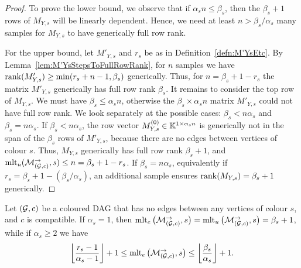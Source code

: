 \begin{proof}
	To prove the lower bound, we observe that if $\alpha_s n \leq \beta_s$, then the $\beta_s + 1$ rows of $M_{Y,s}$ will be linearly dependent. Hence, we need at least $n > \beta_s / \alpha_s$ many samples for $M_{Y,s}$ to have generically full row rank.
	
	For the upper bound, let $M'_{Y,s}$ and $r_s$ be as in Definition~\ref{defn:M'YsEtc}. By Lemma~\ref{lem:M'YsStepsToFullRowRank}, for $n$ samples we have $\operatorname{rank}(M_{Y,s}') \geq \min(r_s + n - 1, \beta_s)$ generically.
	Thus, for $n = \beta_s + 1 - r_s$ the matrix $M'_{Y,s}$ generically has full row rank $\beta_s$.
	It remains to consider the top row of $M_{Y,s}$. We must have $\beta_s \leq \alpha_s n$, otherwise the $\beta_s \times \alpha_s n$ matrix $M'_{Y,s}$ could not have full row rank. We look separately at the possible cases: $\beta_s < n \alpha_s$ and $\beta_s = n \alpha_s$.
	If $\beta_s < n \alpha_s$, the row vector $M_{Y,s}^{(0)} \in \mathbb K^{1 \times \alpha_s n}$ is generically not in the span of the $\beta_s$ rows of $M'_{Y,s}$, because there are no edges between vertices of colour $s$. Thus, $M_{Y,s}$ generically has full row rank $\beta_s + 1$, and $\operatorname{mlt}_u(\mathcal{M}_{(\mathcal{G}, c)}^{\to}, s) \leq n = \beta_s + 1 - r_s$. If $\beta_s = n \alpha_s$, equivalently if $r_s = \beta_s + 1 - (\beta_s / \alpha_s)$, an additional sample ensures $\operatorname{rank}(M_{Y,s}) = \beta_s + 1$ generically.
\end{proof}


\begin{prop} \label{prop:boundMltsExistence}
	Let $(\mathcal{G}, c)$ be a coloured DAG that has no edges between any vertices of colour $s$, and $c$ is compatible. 
	If $\alpha_s = 1$, then $\operatorname{mlt}_e \big(\mathcal{M}_{(\mathcal{G}, c)}^{\to}, s \big) = \operatorname{mlt}_u \big(\mathcal{M}_{(\mathcal{G}, c)}^{\to}, s \big) = \beta_s + 1$, while
	if $\alpha_s \geq 2$ we have
		\[ \left\lfloor \frac{r_s-1}{\alpha_s-1} \right\rfloor + 1  \leq \operatorname{mlt}_e \big(\mathcal{M}_{(\mathcal{G}, c)}^{\to}, s\big) \leq \left\lfloor \frac{\beta_s}{\alpha_s} \right\rfloor + 1 .\]
\end{prop}


